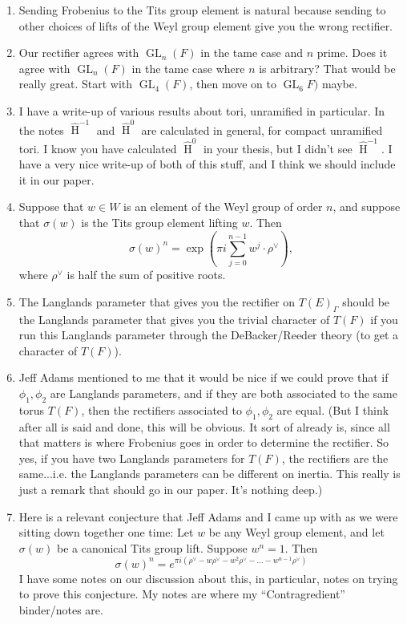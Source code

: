\documentclass{article}
\DeclareMathOperator{\HH}{H}
\DeclareMathOperator{\GL}{GL}
\newcommand{\HT}[1]{\widehat{\HH}^{#1}}
\begin{document}
\begin{enumerate}
\item Sending Frobenius to the Tits group element is natural because sending to other choices of lifts of the Weyl group element give you the wrong rectifier.

\item Our rectifier agrees with $\GL_n(F)$ in the tame case and $n$ prime.  Does it agree with $\GL_n(F)$ in the tame case where $n$ is arbitrary?  That would be really great.  Start with $\GL_4(F)$, then move on to $\GL_6F)$ maybe.

\item I have a write-up of various results about tori, unramified in particular.  In the notes $\HT{-1}$ and $\HT{0}$ are calculated in general, for compact unramified tori.  I know you have calculated $\HT{0}$ in your thesis, but I didn't see $\HT{-1}$.  I have a very nice write-up of both of this stuff, and I think we should include it in our paper.

\item Suppose that $w \in W$ is an element of the Weyl group of order $n$, and suppose that $\sigma(w)$ is the Tits group element lifting $w$.  Then
$$\sigma(w)^n = \exp\left(\pi i \sum_{j=0}^{n-1} w^j \cdot \rho^\vee\right),$$
where $\rho^{\vee}$ is half the sum of positive roots.

\item The Langlands parameter that gives you the rectifier on $T(E)_{\Gamma}$ should be the Langlands parameter that gives you the trivial character of $T(F)$ if you run this Langlands parameter through the DeBacker/Reeder theory (to get a character of $T(F)$).

\item Jeff Adams mentioned to me that it would be nice if we could prove that if $\phi_1, \phi_2$ are Langlands parameters, and if they are both associated to the same torus $T(F)$, then the rectifiers associated to $\phi_1, \phi_2$ are equal.  (But I think after all is said and done, this will be obvious.  It sort of already is, since all that matters is where Frobenius goes in order to determine the rectifier.  So yes, if you have two Langlands parameters for $T(F)$, the rectifiers are the same...i.e. the Langlands parameters can be different on inertia.  This really is just a remark that should go in our paper.  It's nothing deep.)

\item Here is a relevant conjecture that Jeff Adams and I came up with as we were sitting down together one time: Let $w$ be any Weyl group element, and let $\sigma(w)$ be a canonical Tits group lift.  Suppose $w^n = 1$.  Then $$\sigma(w)^n = e^{\pi i(\rho^{\vee} - w \rho^{\vee} - w^2 \rho^{\vee} - ... - w^{n-1} \rho^{\vee})}$$  I have some notes on our discussion about this, in particular, notes on trying to prove this conjecture.  My notes are where my ``Contragredient'' binder/notes are.


\end{enumerate}
\end{document}
